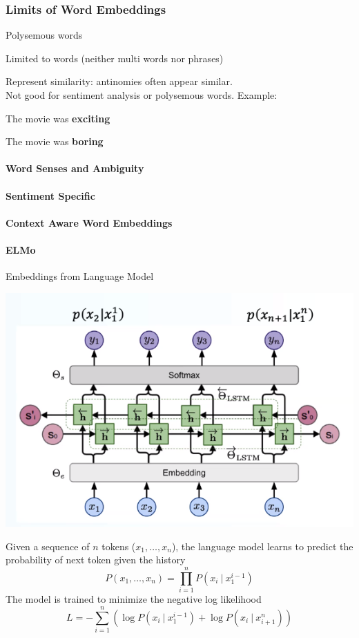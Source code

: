 \documentclass[10pt]{report}
\begin{document}
\subsubsection{Limits of Word Embeddings} \begin{list}{}{}
	\item Polysemous words
	\item Limited to words (neither multi words nor phrases)
	\item Represent similarity: antinomies often appear similar.\\
	Not good for sentiment analysis or polysemous words. Example:
	\begin{list}{}{}
		\item The movie was \textbf{exciting}
		\item The movie was \textbf{boring}
	\end{list}
\end{list}
\paragraph{Word Senses and Ambiguity}
\paragraph{Sentiment Specific}
\paragraph{Context Aware Word Embeddings}
\paragraph{ELMo} Embeddings from Language Model
\begin{center}
	\includegraphics[scale=0.5]{8.png}
\end{center}
Given a sequence of $n$ tokens ($x_1,\ldots,x_n$), the language model learns to predict the probability of next token given the history
$$P(x_1,\ldots,x_n)=\prod_{i=1}^n P(x_i\:|\:x_1^{i-1})$$
The model is trained to minimize the negative log likelihood
$$L = -\sum_{i=1}^n\left(\log P(x_i\:|\:x_1^{i-1})+\log P(x_i\:|\:x_{i+1}^n) \right)$$
\end{document}
